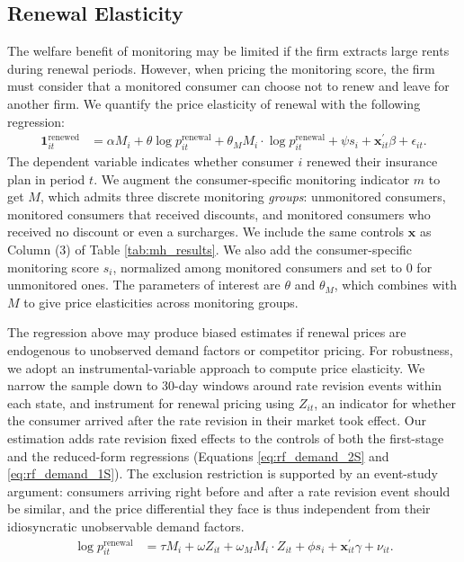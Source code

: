 \subsection{Renewal Elasticity\label{subsec:rf_demand}}

The welfare benefit of monitoring may be limited if the firm extracts large rents during renewal periods. However, when pricing the monitoring score, the firm must consider that a monitored consumer can choose not to renew and leave for another firm. We quantify the price elasticity of renewal with the following regression:
\begin{align}
    \mathbf{1}^{\text{renewed}}_{it} & = \alpha M_{i} + \theta \log p^{\text{renewal}}_{it} + \theta_M M_{i} \cdot \log p^{\text{renewal}}_{it} + \psi s_{i} + \mathbf{x}_{it}^\prime\beta + \epsilon_{it}.\label{eq:rf_demand_2S}
\end{align}
The dependent variable indicates whether consumer $i$ renewed their insurance plan in period $t$. We augment the consumer-specific monitoring indicator $m$ to get $M$, which admits three discrete monitoring \textit{groups}: unmonitored consumers, monitored consumers that received discounts, and monitored consumers who received no discount or even a surcharges. We include the same controls $\mathbf{x}$ as Column (3) of Table \ref{tab:mh_results}. We also add the consumer-specific monitoring score $s_i$, normalized among monitored consumers and set to $0$ for unmonitored ones. The parameters of interest are $\theta$ and $\theta_M$, which combines with $M$ to give price elasticities across monitoring groups.

The regression above may produce biased estimates if renewal prices are endogenous to unobserved demand factors or competitor pricing. For robustness, we adopt an instrumental-variable approach to compute price elasticity. We narrow the sample down to 30-day windows around rate revision events within each state, and instrument for renewal pricing using $Z_{it}$, an indicator for whether the consumer arrived after the rate revision in their market took effect. Our estimation adds rate revision fixed effects to the controls of both the first-stage and the reduced-form regressions (Equations \ref{eq:rf_demand_2S} and \ref{eq:rf_demand_1S}). The exclusion restriction is supported by an event-study argument: consumers arriving right before and after a rate revision event should be similar, and the price differential they face is thus independent from their idiosyncratic unobservable demand factors.
\begin{align}
    \log p^{\text{renewal}}_{it} & = \tau M_{i} + \omega Z_{it} + \omega_M M_{i} \cdot Z_{it} + \phi s_{i} + \mathbf{x}_{it}^\prime \gamma + \nu_{it}.
    \label{eq:rf_demand_1S}
\end{align}

